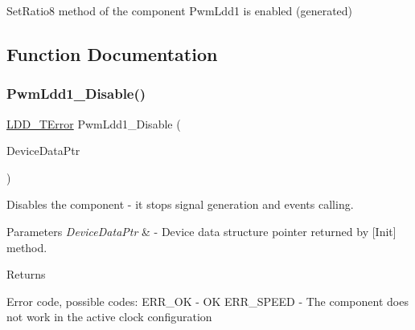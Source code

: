 Set\+Ratio8 method of the component Pwm\+Ldd1 is enabled (generated) 

\subsection{Function Documentation}
\mbox{\label{group___pwm_ldd1__module_gadaeb47f81e90a1e38e65d1bc79fbe794}} 
\subsubsection{\texorpdfstring{Pwm\+Ldd1\+\_\+\+Disable()}{PwmLdd1\_Disable()}}
{\footnotesize\ttfamily \hyperlink{group___p_e___types__module_ga24c2b045fd04e79e85f261ce4df35588}{L\+D\+D\+\_\+\+T\+Error} Pwm\+Ldd1\+\_\+\+Disable (\begin{DoxyParamCaption}\item[{\hyperlink{group___p_e___types__module_gac5cf1362f1f0e3a2ce71b1bf2276d091}{L\+D\+D\+\_\+\+T\+Device\+Data} $\ast$}]{Device\+Data\+Ptr }\end{DoxyParamCaption})}



Disables the component -\/ it stops signal generation and events calling. 


\begin{DoxyParams}{Parameters}
{\em Device\+Data\+Ptr} & -\/ Device data structure pointer returned by \mbox{[}Init\mbox{]} method. \\
\hline
\end{DoxyParams}
\begin{DoxyReturn}{Returns}

\begin{DoxyItemize}
\item Error code, possible codes\+: E\+R\+R\+\_\+\+OK -\/ OK E\+R\+R\+\_\+\+S\+P\+E\+ED -\/ The component does not work in the active clock configuration 
\end{DoxyItemize}
\end{DoxyReturn}
\mbox{\label{group___pwm_ldd1__module_gaf9431af80fbe8bb8cd7e756d4b54968f}} 
